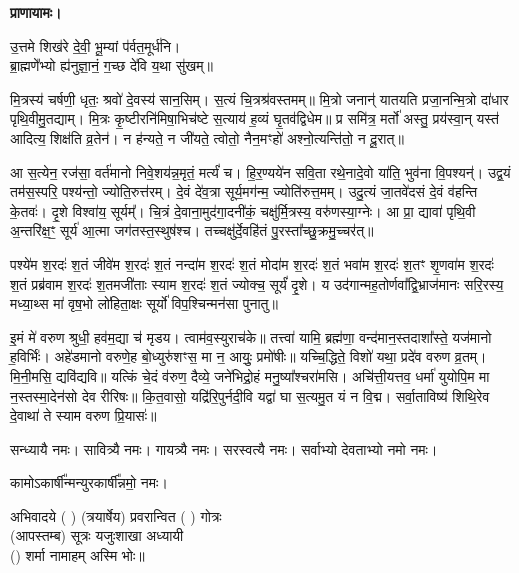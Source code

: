 \textbf{प्राणायामः।}


उ॒त्तमे शिख॑रे दे॒वी॒ भू॒म्यां प॑र्वत॒मूर्ध॑नि।\\
ब्रा॒ह्मणे॑॑भ्यो ह्य॑नुज्ञा॒नं॒ ग॒च्छ दे॑वि य॒था सु॑खम्॥


मि॒त्रस्य॑ चर्\mbox{}षणी॒ धृतः॒ श्रवो॑ दे॒वस्य॑ सान॒सिम्। स॒त्यं चि॒त्रश्र॑वस्तमम्॥ मि॒त्रो जनान्॑ यातयति प्रजा॒नन्मि॒त्रो दा॑धार पृथि॒वीमु॒तद्याम्। मि॒त्रः कृ॒ष्टीरनि॑मिषा॒भिच॑ष्टे स॒त्याय॑ ह॒व्यं घृ॒तव॑द्विधेम॥ प्र समि॑त्र॒ मर्तो॑ अस्तु॒ प्रय॑स्वा॒न् यस्त॑ आदित्य॒ शिक्ष॑ति व्र॒तेन॑। न ह॑न्यते॒ न जी॑यते॒ त्वोतो॒ नैन॒मꣳहो॑ अश्नो॒त्यन्ति॑तो॒ न दू॒रात्॥


आ स॒त्येन॒ रज॑सा॒ वर्त॑मानो निवे॒शय॑न्न॒मृतं॒ मर्त्यं॑ च। हि॒र॒ण्यये॑न सवि॒ता रथे॒नादे॒वो या॑ति॒ भुव॑ना वि॒पश्यन्॑। उद्व॒यं तम॑स॒स्परि॒ पश्य॑न्तो॒ ज्योति॒रुत्त॑रम्। दे॒वं दे॑व॒त्रा सूर्य॒मग॑न्म॒ ज्योति॑रुत्त॒मम्। उदु॒त्यं जा॒तवे॑दसं दे॒वं व॑हन्ति के॒तवः॑। दृ॒शे विश्वा॑य॒ सूर्यम्᳚। चि॒त्रं दे॒वाना॒मुद॑गा॒दनी॑कं॒ चक्षु॑र्मि॒त्रस्य॒ वरु॑णस्या॒ग्नेः। आ प्रा॒ द्यावा॑ पृथि॒वी अ॒न्तरि॑क्ष॒ꣳ॒ सूर्य॑ आ॒त्मा जग॑तस्त॒स्थुष॑श्च। तच्चक्षु॑र्दे॒वहि॑तं पु॒रस्ता᳚च्छु॒क्रमु॒च्चर॑त्॥

पश्ये॑म श॒रदः॑ श॒तं जीवे॑म श॒रदः॑ श॒तं नन्दा॑म श॒रदः॑ श॒तं मोदा॑म श॒रदः॑ श॒तं भवा॑म श॒रदः॑ श॒तꣳ शृ॒णवा॑म श॒रदः॑ श॒तं प्रब्र॑वाम श॒रदः॑ श॒तमजी॑ताः स्याम श॒रदः॑ श॒तं ज्योक्च॒ सूर्यं॑ दृ॒शे। य उद॑गान्मह॒तोर्णवा᳚द्वि॒भ्राज॑मानः सरि॒रस्य॒ मध्या॒थ्स मा॑ वृष॒भो लो॑हिता॒क्षः सूर्यो॑ विप॒श्चिन्मन॑सा पुनातु॥

इ॒मं मे॑ वरुण श्रुधी॒ हव॑म॒द्या च॑ मृडय। त्वाम॑व॒स्युराच॑के॥ तत्त्वा॑ यामि॒ ब्रह्म॑णा॒ वन्द॑मान॒स्तदाशा᳚स्ते॒ यज॑मानो ह॒विर्भिः॑। अहे॑डमानो वरुणे॒ह बो॒ध्युरु॑शꣳस॒ मा न॒ आयुः॒ प्रमो॑षीः॥
यच्चि॒द्धिते॒ विशो॑ यथा॒ प्रदे॑व वरुण व्र॒तम्। मि॒नी॒मसि॒ द्यवि॑द्यवि॥ यत्किं चे॒दं व॑रुण॒ दैव्ये॒ जने॑भिद्रो॒हं मनु॒ष्या᳚श्चरा॑मसि। अचि॑त्ती॒यत्तव॒ धर्मा॑ युयोपि॒म मा न॒स्तस्मा॒देन॑सो देव रीरिषः॥ कि॒त॒वासो॒ यद्रि॑रि॒पुर्नदी॒वि यद्वा॑ घा स॒त्यमु॒त यं न वि॒द्म। सर्वा॒ताविष्य॑ शिथि॒रेव दे॒वाथा॑ ते स्याम वरुण प्रि॒यासः॑॥


सन्ध्यायै नमः।  
सावित्र्यै नमः। 
गायत्र्यै नमः।  
सरस्वत्यै नमः।  
सर्वाभ्यो देवताभ्यो नमो नमः। 

कामोऽकार्\mbox{}षी᳚न्मन्युरकार्\mbox{}षी᳚न्नमो॒ नमः।

अभिवादये ( ) (त्रयार्षेय) प्रवरान्वित ( ) गोत्रः\\
(आपस्तम्ब) सूत्रः यजुःशाखा अध्यायी\\
() शर्मा नामाहम् अस्मि भोः॥

